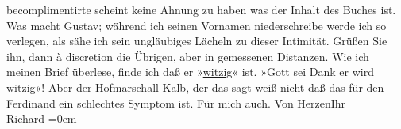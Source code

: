 \begin{ledgroupsized}[t]{13cm}
               becomplimentirte scheint keine Ahnung zu haben was der Inhalt des Buches ist. Was macht Gustav; während ich seinen Vornamen niederschreibe werde ich so
               verlegen, als sähe ich sein ungläubiges Lächeln zu dieser Intimität. Grüßen Sie ihn,
               dann à discretion die Übrigen, aber in gemessenen Distanzen.\pend
           \pstart
           Wie ich meinen Brief überlese, finde ich daß er »\uline{witzig}« ist. »Gott sei Dank er wird witzig«! Aber der
               Hofmarschall Kalb, der das sagt
               weiß nicht daß das für den Ferdinand ein schlechtes Symptom ist. Für mich auch.\pend
           \pstart
           Von Herzen\hspace*{1.5em}Ihr{\\[\baselineskip]}\spacefill\mbox{Richard}\pend
           \leftskip=0em{}
         
         \endnumbering{}\end{ledgroupsized}  \newcommand{\dateiname}{L01016}\newcommand{\titel}{Richard Beer-Hofmann an Arthur Schnitzler, 22. 2. 1900}\newcommand{\editorInnen}{Martin Anton Müller und Gerd-Hermann Susen}
      